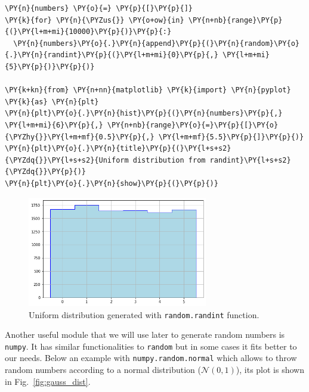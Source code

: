  \begin{tcolorbox}[breakable, size=fbox, boxrule=1pt, pad at break*=1mm,colback=cellbackground, colframe=cellborder]
\begin{Verbatim}[commandchars=\\\{\}]
\PY{n}{numbers} \PY{o}{=} \PY{p}{[}\PY{p}{]}
\PY{k}{for} \PY{n}{\PYZus{}} \PY{o+ow}{in} \PY{n+nb}{range}\PY{p}{(}\PY{l+m+mi}{10000}\PY{p}{)}\PY{p}{:}
  \PY{n}{numbers}\PY{o}{.}\PY{n}{append}\PY{p}{(}\PY{n}{random}\PY{o}{.}\PY{n}{randint}\PY{p}{(}\PY{l+m+mi}{0}\PY{p}{,} \PY{l+m+mi}{5}\PY{p}{)}\PY{p}{)}

\PY{k+kn}{from} \PY{n+nn}{matplotlib} \PY{k}{import} \PY{n}{pyplot} \PY{k}{as} \PY{n}{plt}
\PY{n}{plt}\PY{o}{.}\PY{n}{hist}\PY{p}{(}\PY{n}{numbers}\PY{p}{,} \PY{l+m+mi}{6}\PY{p}{,} \PY{n+nb}{range}\PY{o}{=}\PY{p}{[}\PY{o}{\PYZhy{}}\PY{l+m+mf}{0.5}\PY{p}{,} \PY{l+m+mf}{5.5}\PY{p}{]}\PY{p}{)}
\PY{n}{plt}\PY{o}{.}\PY{n}{title}\PY{p}{(}\PY{l+s+s2}{\PYZdq{}}\PY{l+s+s2}{Uniform distribution from randint}\PY{l+s+s2}{\PYZdq{}}\PY{p}{)}
\PY{n}{plt}\PY{o}{.}\PY{n}{show}\PY{p}{(}\PY{p}{)}
\end{Verbatim}
\end{tcolorbox}

\begin{figure}[h]
\centering
\includegraphics[width=0.7\textwidth]{figures/lesson4_3_0.png}
\caption{Uniform distribution generated with \texttt{random.randint} function.}
\label{fig:uniform_dist}
\end{figure}
    
Another useful module that we will use later to generate random numbers is \texttt{numpy}. It has similar functionalities to \texttt{random} but in some cases it fits better to our needs.    
Below an example with \texttt{numpy.random.normal} which allows to throw random numbers according to a normal distribution
(\(\mathcal{N}(0, 1)\)), its plot is shown in Fig.~\ref{fig:gauss_dist}.

